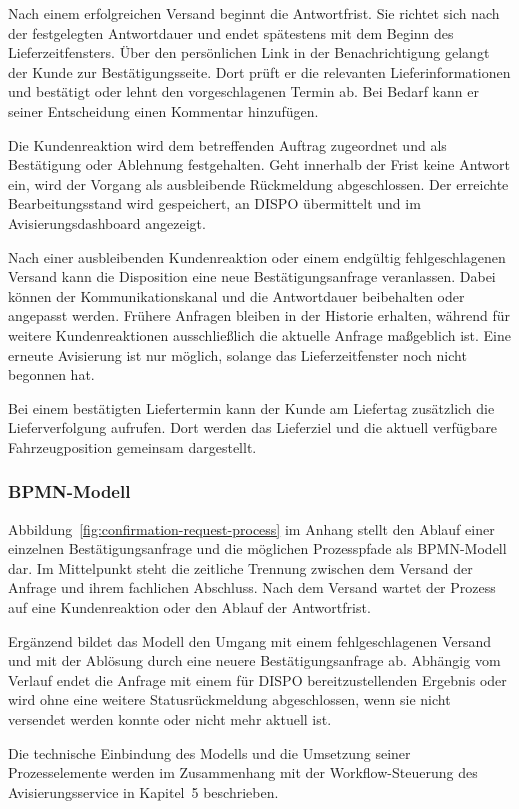 Nach einem erfolgreichen Versand beginnt die Antwortfrist. Sie
richtet sich nach der festgelegten Antwortdauer und endet
spätestens mit dem Beginn des Lieferzeitfensters. Über den
persönlichen Link in der Benachrichtigung gelangt der Kunde zur
Bestätigungsseite. Dort prüft er die relevanten
Lieferinformationen und bestätigt oder lehnt den
vorgeschlagenen Termin ab. Bei Bedarf kann er seiner
Entscheidung einen Kommentar hinzufügen.

Die Kundenreaktion wird dem betreffenden Auftrag zugeordnet und
als Bestätigung oder Ablehnung festgehalten. Geht innerhalb der
Frist keine Antwort ein, wird der Vorgang als ausbleibende
Rückmeldung abgeschlossen. Der erreichte Bearbeitungsstand wird
gespeichert, an DISPO übermittelt und im
Avisierungsdashboard angezeigt.

Nach einer ausbleibenden Kundenreaktion oder einem endgültig
fehlgeschlagenen Versand kann die Disposition eine neue
Bestätigungsanfrage veranlassen. Dabei können der
Kommunikationskanal und die Antwortdauer beibehalten oder
angepasst werden. Frühere Anfragen bleiben in der Historie
erhalten, während für weitere Kundenreaktionen ausschließlich
die aktuelle Anfrage maßgeblich ist. Eine erneute Avisierung ist
nur möglich, solange das Lieferzeitfenster noch nicht begonnen
hat.

Bei einem bestätigten Liefertermin kann der Kunde am Liefertag
zusätzlich die Lieferverfolgung aufrufen. Dort werden das
Lieferziel und die aktuell verfügbare Fahrzeugposition gemeinsam
dargestellt.

\subsubsection{BPMN-Modell}

Abbildung~\ref{fig:confirmation-request-process} im Anhang stellt den
Ablauf einer einzelnen Bestätigungsanfrage und die möglichen
Prozesspfade als BPMN-Modell dar. Im Mittelpunkt steht die
zeitliche Trennung zwischen dem Versand der Anfrage und ihrem
fachlichen Abschluss. Nach dem Versand wartet der Prozess auf
eine Kundenreaktion oder den Ablauf der Antwortfrist.

Ergänzend bildet das Modell den Umgang mit einem
fehlgeschlagenen Versand und mit der Ablösung durch eine neuere
Bestätigungsanfrage ab. Abhängig vom Verlauf endet die Anfrage
mit einem für DISPO bereitzustellenden Ergebnis oder wird ohne
eine weitere Statusrückmeldung abgeschlossen, wenn sie nicht
versendet werden konnte oder nicht mehr aktuell ist.

Die technische Einbindung des Modells und die Umsetzung seiner
Prozesselemente werden im Zusammenhang mit der
Workflow-Steuerung des Avisierungsservice in Kapitel~5
beschrieben.